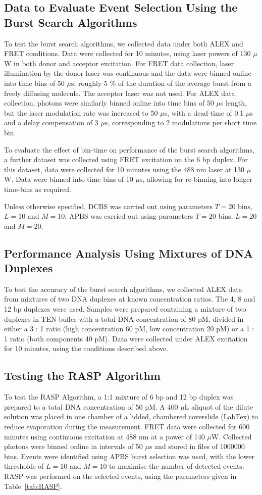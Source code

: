 \documentclass[10pt]{article}
\begin{document}
\subsection*{Data to Evaluate Event Selection Using the Burst Search Algorithms}
To test the burst search algorithms, we collected data under both ALEX and FRET conditions. Data were collected for 10 minutes, using laser powers of 130 $\mu$W in both donor and acceptor excitation. For FRET data collection, laser illumination by the donor laser was continuous and the data were binned online into time bins of 50 $\mu$s, roughly 5 \% of the duration of the average burst from a freely diffusing molecule. The acceptor laser was not used. For ALEX data collection, photons were similarly binned online into time bins of 50 $\mu$s length, but the laser modulation rate was increased to 50 $\mu$s, with a dead-time of 0.1 $\mu$s and a delay compensation of 3 $\mu$s, corresponding to 2 modulations per short time bin. 

To evaluate the effect of bin-time on performance of the burst search algorithms, a further dataset was collected using FRET excitation on the 6 bp duplex. For this dataset, data were collected for 10 minutes using the 488 nm laser at 130 $\mu$W. Data were binned into time bins of 10 $\mu$s, allowing for re-binning into longer time-bins as required.

Unless otherwise specified, DCBS was carried out using parameters $T = 20$ bins, $L = 10$ and $M = 10$; APBS was carried out using parameters $T = 20$ bins, $L = 20$ and $M = 20$.

\subsection*{Performance Analysis Using Mixtures of DNA Duplexes}
To test the accuracy of the burst search algorithms, we collected ALEX data from mixtures of two DNA duplexes at known concentration ratios. The 4, 8 and 12 bp duplexes were used. Samples were prepared containing a mixture of two duplexes in TEN buffer with a total DNA concentration of 80 pM, divided in either a 3 : 1 ratio (high concentration 60 pM, low concentration 20 pM) or a 1 : 1 ratio (both components 40 pM). Data were collected under ALEX excitation for 10 minutes, using the conditions described above.  


\subsection*{Testing the RASP Algorithm}
To test the RASP Algorithm, a 1:1 mixture of 6 bp and 12 bp duplex was prepared to a total DNA concentration of 50 pM. A 400 $\mu$L aliquot of the dilute solution was placed in one chamber of a lidded, chambered coverslide (LabTex) to reduce evaporation during the measurement. FRET data were collected for 600 minutes using continuous excitation at 488 nm at a power of 140 $\mu$W. Collected photons were binned online in intervals of 50 $\mu$s and stored in files of 1000000 bins. Events were identified using APBS burst selection was used, with the lower thresholds of $L = 10$ and $M = 10$ to maximise the number of detected events. RASP was performed on the selected events, using the parameters given in Table~\ref{tab:RASP}. 
\end{document}

